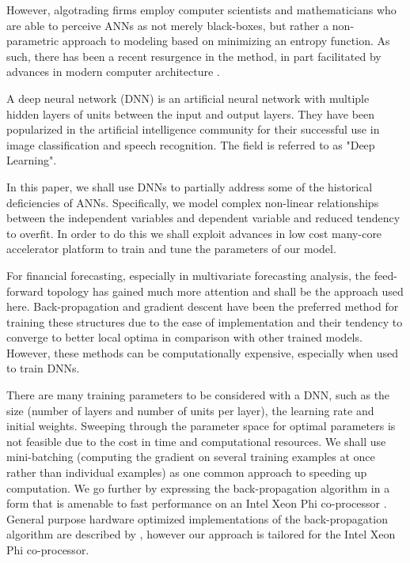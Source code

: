 \documentclass{article}
\begin{document}
However, algotrading firms employ computer scientists and mathematicians who are able to perceive ANNs as not merely black-boxes, but rather a non-parametric approach to modeling based on minimizing an entropy function. As such, there has been a recent resurgence in the method, in part facilitated by advances in modern computer architecture \citep{Chen2013, Niaki2013, Vanstone2010}.


A deep neural network (DNN) is an artificial neural network with multiple hidden layers of units between the input and output layers. They have been popularized in the artificial intelligence community for their successful use in image classification \citep{krizhevsky2012} and speech recognition. The field is referred to as "Deep Learning".
  
In this paper, we shall use DNNs to partially address some of the historical deficiencies of ANNs. Specifically, we model complex non-linear relationships between the independent variables and dependent variable and reduced tendency to overfit. In order to do this we shall exploit advances in low cost many-core accelerator platform to train and tune the parameters of our model.

For financial forecasting, especially in multivariate forecasting analysis, the feed-forward
topology has gained much more attention and shall be the approach used here. Back-propagation and gradient descent have been the preferred method for training these structures due to the ease of implementation and their tendency to converge to better local optima in comparison with other trained models. However, these methods can be computationally expensive, especially when used to train DNNs. 

There are many training parameters to be considered with a DNN, such as the size (number of layers and number of units per layer), the learning rate and initial weights. Sweeping through the parameter space for optimal parameters is not feasible due to the cost in time and computational resources. We shall use mini-batching (computing the gradient on several training examples at once rather than individual examples) as one common approach to speeding up computation. We go further by expressing the back-propagation algorithm in a form that is amenable to fast performance on an Intel Xeon Phi co-processor \citep{Jeffers2013}. General purpose hardware optimized implementations of the back-propagation algorithm are described by \cite{Shekhar94}, however our approach is tailored for the Intel Xeon Phi co-processor.
\end{document}
